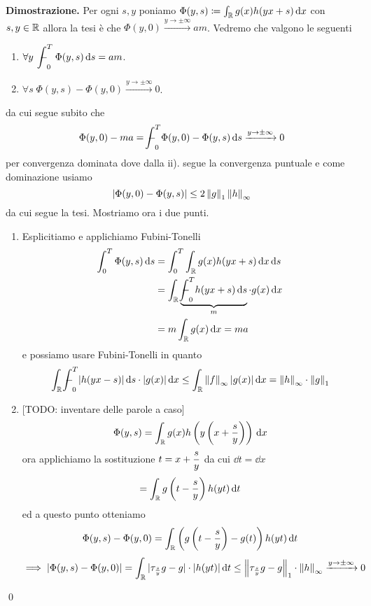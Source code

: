 \textbf{Dimostrazione.}
Per ogni $s, y$ poniamo $\Phi(y, s) \coloneqq \int_\mathbb R g(x) h(yx + s) \,\mathrm{d} x$ con $s, y \in \mathbb R$ allora la tesi è che $\Phi(y, 0) \xrightarrow{y \to \pm\infty} a m$.
Vedremo che valgono le seguenti
\begin{enumerate}
	\item $\forall y \; \ds \avint_0^T \Phi(y, s) \dd s = am$.
	\item $\forall s \; \Phi(y, s) - \Phi(y, 0) \xrightarrow{y \to \pm \infty} 0$.
\end{enumerate}
da cui segue subito che
$$
\Phi(y, 0) - ma = \avint_0^T \Phi(y, 0) - \Phi(y, s) \dd s \xrightarrow{y \to \pm \infty} 0
$$
per convergenza dominata dove dalla ii). segue la convergenza puntuale e come dominazione usiamo
$$
|\Phi(y, 0) - \Phi(y, s)| \leq 2 \left\lVert g \right\rVert_1 \left\lVert h \right\rVert_\infty
$$
da cui segue la tesi. Mostriamo ora i due punti.
\begin{enumerate}
	\item Esplicitiamo e applichiamo Fubini-Tonelli
		$$
		\begin{aligned}
			\int_0^T \Phi(y, s) \dd s
			&= \int_0^T \int_\R g(x) h(yx + s) \dd x \dd s \\
			&= \int_\R \underbrace{\avint_0^T h(yx + s) \dd s}_m \cdot g(x) \dd x \\
			&= m \int_\R g(x) \dd x = m a
		\end{aligned}
		$$
		e possiamo usare Fubini-Tonelli in quanto 
		$$
		\ds \int_\R \avint_0^T |h(yx - s)| \dd s \cdot |g(x)| \dd x \leq \int_\R \norm{f}_\infty |g(x)| \dd x = \norm{h}_\infty \cdot \norm{g}_1
		$$

	\item {} [TODO: inventare delle parole a caso]
		$$
		\Phi(y, s) 
		= \int_\mathbb R g(x) h\left(y \left( x + \frac{s}{y} \right)\right) \,\mathrm{d} x 
		$$
		ora applichiamo la sostituzione $\displaystyle t = x + \frac{s}{y}$ da cui $\dd t = \dd x$
		$$
		= \int_\mathbb R g \left( t - \frac{s}{y} \right) h(yt) \,\mathrm{d} t
		$$
		ed a questo punto otteniamo
		$$
		\Phi(y, s) - \Phi(y, 0) = \int_\mathbb R \left(g\left( t - \frac{s}{y}\right) - g(t) \right) h(yt) \,\mathrm{d} t 
		$$
		$$
		\implies
		|\Phi(y, s) - \Phi(y, 0)| = \int_\mathbb R |\tau_{\frac{s}{y}} g - g| \cdot |h(yt)| \,\mathrm{d} t
		\leq \left\lVert \tau_{\frac{s}{y}} g - g \right\rVert_1 \cdot \left\lVert h \right\rVert_\infty \xrightarrow{y \to \pm \infty} 0
		$$
\end{enumerate}
\qed

